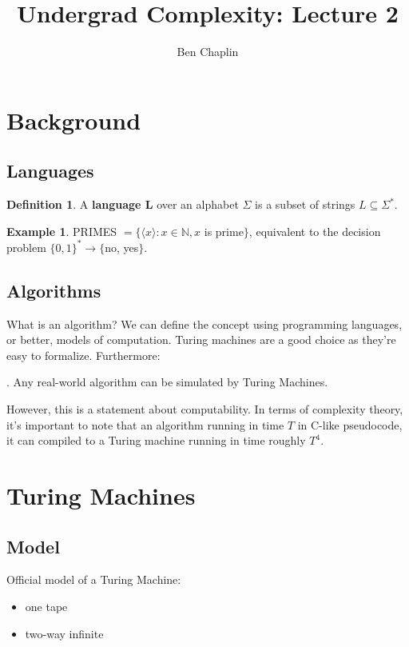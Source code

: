\documentclass[11pt]{article}
\title{Undergrad Complexity: Lecture 2}
\author{Ben Chaplin}
\date{}
\theoremstyle{plain}
\theoremstyle{definition}
\newtheorem*{defn}{Definition}
\newtheorem*{ex}{Example}
\newcommand{\N}{\mathbb{N}}
\begin{document}
\maketitle
\tableofcontents

\section{Background}
\subsection{Languages}

\begin{defn}
    A {\bf language L} over an alphabet $\Sigma$ is a subset of strings $L \subseteq \Sigma^*$.
\end{defn}

\begin{ex}
PRIMES $= \{\langle x \rangle : x \in \N, x$ is prime$\}$, equivalent to the decision problem $\{0, 1\}^* \rightarrow \{$no, yes$\}$.
\end{ex}

\subsection{Algorithms}

What is an algorithm? We can define the concept using programming languages, or better, models of computation. Turing machines are 
a good choice as they're easy to formalize. Furthermore: \medskip

. Any real-world algorithm can be simulated by Turing Machines.\medskip

However, this is a statement about computability. In terms of complexity theory, it's important to note that an algorithm running in 
time $T$ in C-like pseudocode, it can compiled to a Turing machine running in time roughly $T^4$. 

\section{Turing Machines}
\subsection{Model}

Official model of a Turing Machine: 
\begin{itemize}
    \item one tape
    \item two-way infinite
\end{itemize}
\end{document}
